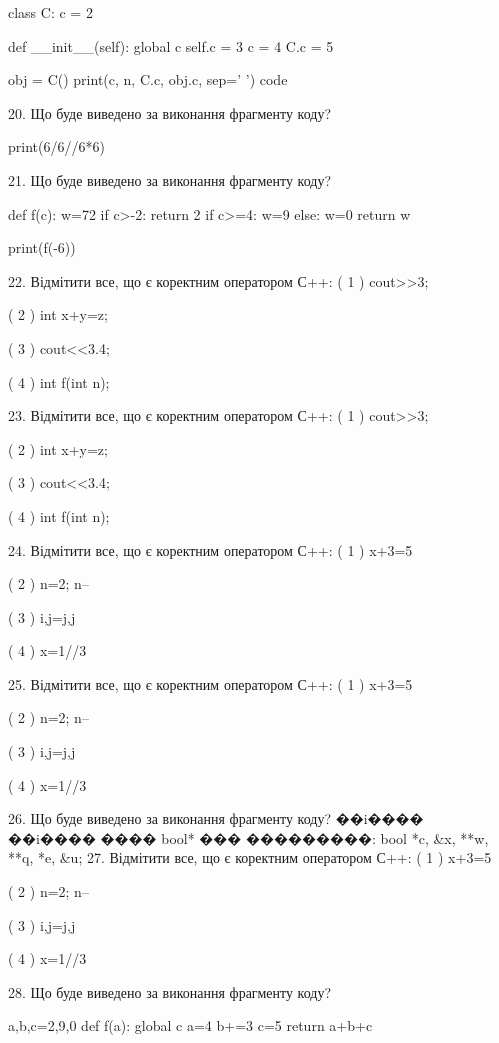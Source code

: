 \documentclass[11pt]{article}
\begin{document}
class C:
    c = 2
    
    def __init__(self):
global c        self.c = 3
        c = 4
        C.c = 5

obj = C()
print(c, n, C.c, obj.c, sep=' ')
code

20. Що буде виведено за виконання фрагменту коду?

print(6/6//6*6)

21. Що буде виведено за виконання фрагменту коду?

def f(c):
    w=72
    if c>-2: 
        return 2
    if c>=4:
         w=9
    else:
         w=0
    return w

print(f(-6))

22. Відмітити все, що є коректним оператором С++:
( 1 ) cout>>3;

( 2 ) int x+y=z;

( 3 ) cout<<3.4;

( 4 ) int f(int n);

23. Відмітити все, що є коректним оператором С++:
( 1 ) cout>>3;

( 2 ) int x+y=z;

( 3 ) cout<<3.4;

( 4 ) int f(int n);

24. Відмітити все, що є коректним оператором С++:
( 1 ) x+3=5

( 2 ) n=2; n--

( 3 ) i,j=j,j

( 4 ) x=1//3

25. Відмітити все, що є коректним оператором С++:
( 1 ) x+3=5

( 2 ) n=2; n--

( 3 ) i,j=j,j

( 4 ) x=1//3

26. Що буде виведено за виконання фрагменту коду?
��i���� ��i���� ���� bool* ��� ���������: bool *c, &x, **w, **q, *e, &u;
27. Відмітити все, що є коректним оператором С++:
( 1 ) x+3=5

( 2 ) n=2; n--

( 3 ) i,j=j,j

( 4 ) x=1//3

28. Що буде виведено за виконання фрагменту коду?

a,b,c=2,9,0
def f(a):
global c    a=4
    b+=3
    c=5
    return a+b+c
\end{document}
